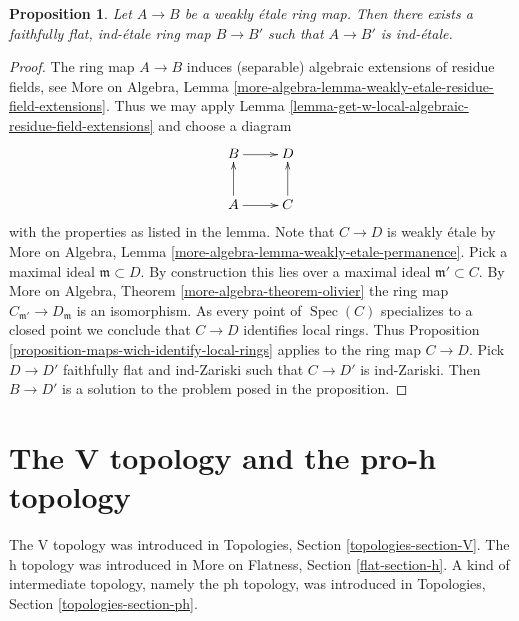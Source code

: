 \documentclass{stacks-project}
\theoremstyle{plain}
\newtheorem{proposition}[subsection]{Proposition}
\theoremstyle{definition}
\theoremstyle{remark}
\numberwithin{equation}{subsection}
\def\Spec{\mathop{\mathrm{Spec}}}
\begin{document}
\begin{proposition}
\label{proposition-weakly-etale}
Let $A \to B$ be a weakly \'etale ring map.
Then there exists a faithfully flat, ind-\'etale ring map
$B \to B'$ such that $A \to B'$ is ind-\'etale.
\end{proposition}

\begin{proof}
The ring map $A \to B$ induces (separable) algebraic extensions of
residue fields, see More on Algebra, Lemma
\ref{more-algebra-lemma-weakly-etale-residue-field-extensions}.
Thus we may apply
Lemma \ref{lemma-get-w-local-algebraic-residue-field-extensions}
and choose a diagram
$$
\xymatrix{
B \ar[r] & D \\
A \ar[r] \ar[u] & C \ar[u]
}
$$
with the properties as listed in the lemma. Note that $C \to D$
is weakly \'etale by
More on Algebra, Lemma \ref{more-algebra-lemma-weakly-etale-permanence}.
Pick a maximal ideal $\mathfrak m \subset D$. By construction
this lies over a maximal ideal $\mathfrak m' \subset C$.
By More on Algebra, Theorem \ref{more-algebra-theorem-olivier}
the ring map $C_{\mathfrak m'} \to D_\mathfrak m$ is an isomorphism.
As every point of $\Spec(C)$ specializes to a closed point we conclude that
$C \to D$ identifies local rings.
Thus Proposition \ref{proposition-maps-wich-identify-local-rings}
applies to the ring map $C \to D$. Pick $D \to D'$ faithfully flat
and ind-Zariski such that $C \to D'$ is ind-Zariski. Then
$B \to D'$ is a solution to the problem posed in the proposition.
\end{proof}





\section{The V topology and the pro-h topology}
\label{section-V-versus-pro-h}

\noindent
The V topology was introduced in
Topologies, Section \ref{topologies-section-V}.
The h topology was introduced in
More on Flatness, Section \ref{flat-section-h}.
A kind of intermediate topology, namely the ph topology,
was introduced in Topologies, Section \ref{topologies-section-ph}.
\end{document}
